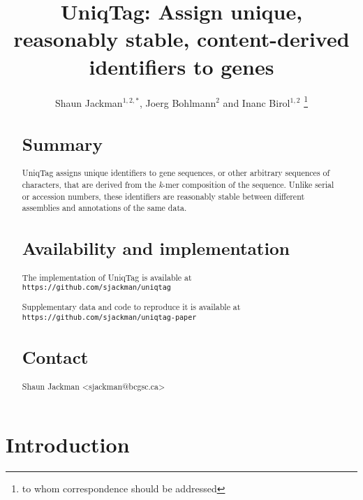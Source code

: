 \documentclass{bioinfo}
\begin{document}

\title{UniqTag: Assign unique, reasonably stable, content-derived
identifiers to genes}
\author{Shaun Jackman$^{1,2,*}$, Joerg Bohlmann$^2$ and Inanc Birol$^{1,2}$
\footnote{to whom correspondence should be addressed}}

\address{$^{1}$BC Cancer Agency Genome Sciences Centre
\\ $^{2}$University of British Columbia}



\maketitle

\begin{abstract}

\section{Summary}

UniqTag assigns unique identifiers to gene sequences, or other arbitrary
sequences of characters, that are derived from the \emph{k}-mer
composition of the sequence. Unlike serial or accession numbers, these
identifiers are reasonably stable between different assemblies and
annotations of the same data.

\section{Availability and implementation}

The implementation of UniqTag is available at
\\ \texttt{https://github.com/sjackman/uniqtag}

Supplementary data and code to reproduce it is available at
\\ \texttt{https://github.com/sjackman/uniqtag-paper}

\section{Contact}

Shaun Jackman \textless{}sjackman@bcgsc.ca\textgreater{}

\end{abstract}

\section{Introduction}
\end{document}
